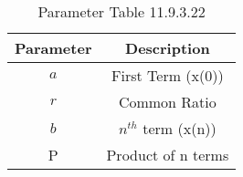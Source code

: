
\begin{table}[ht]
  \centering
  \begin{tabular}{|c||c|}
    \hline
    Parameter & Description  \\
    \hline
	  $a$ & First Term (x(0)) \\
     \hline
     $r$ & Common Ratio \\
    \hline
	  $b$ & $n^{th}$ term (x(n))\\
    \hline
	  P & Product of n terms\\
	  \hline

  \end{tabular}
  \vspace{2mm}
  \caption{Parameter Table 11.9.3.22}
\end{table}
